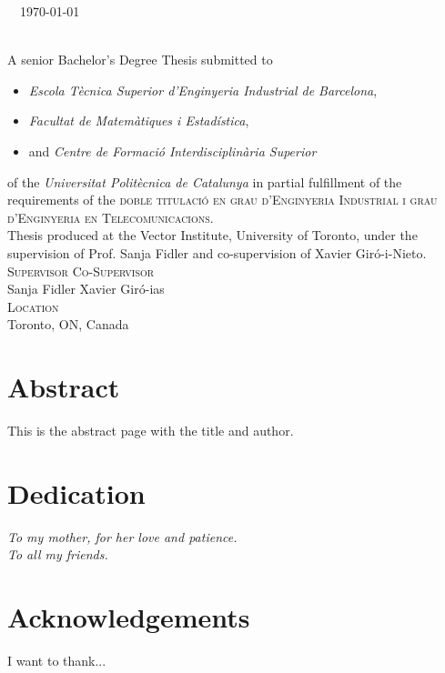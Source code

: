 \makeatletter
\begin{titlepage}
  \@title
\end{titlepage}
\makeatother


\thispagestyle{plain}
\vspace*{\fill}
\makeatletter
\noindent \@author\ \textcopyright\ \today \\
\texttt{\@title} \\
\makeatother

\noindent A senior Bachelor's Degree Thesis submitted to
\begin{itemize}
  \item \textit{Escola Tècnica Superior d'Enginyeria Industrial de Barcelona},
  \item \textit{Facultat de Matemàtiques i Estadística},
  \item and \textit{Centre de Formació Interdisciplinària Superior}
\end{itemize}
of the \textit{Universitat Politècnica de Catalunya} in partial fulfillment of
the requirements of the \textsc{doble titulació en grau d'Enginyeria Industrial
  i grau d'Enginyeria en Telecomunicacions}. \\

\noindent Thesis produced at the Vector Institute, University of Toronto, under the
supervision of Prof. Sanja Fidler and co-supervision of Xavier Giró-i-Nieto. \\

\noindent \textsc{Supervisor} \hfill \textsc{Co-Supervisor} \\
 Sanja Fidler \hfill Xavier Giró-ias \\

\noindent \textsc{Location} \\
Toronto, ON, Canada


\chapter*{Abstract}
This is the abstract page with the title and author.


\chapter*{Dedication}
\vfill
\begin{flushright}
  \it To my mother, for her love and patience. \\
  To all my friends.
\end{flushright}
\vfill


\chapter*{Acknowledgements}
I want to thank...


\tableofcontents
\listoftables
\listoffigures
\clearpage
